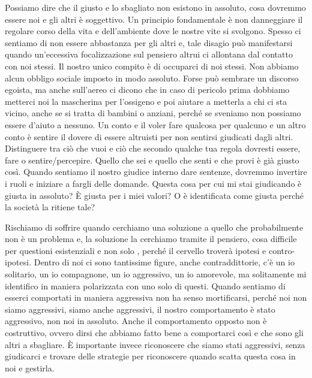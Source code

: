 \documentclass[12pt]{book} %
\begin{document}
Possiamo dire che il giusto e lo sbagliato non esistono in assoluto, cosa dovremmo essere noi e gli altri è soggettivo. Un principio fondamentale è non danneggiare il regolare corso della vita e dell'ambiente dove le nostre vite si svolgono. Spesso ci sentiamo di non essere abbastanza per gli altri e, tale disagio può manifestarsi quando un'eccessiva focalizzazione sul pensiero altrui ci allontana dal contatto con noi stessi.
Il nostro unico compito è di occuparci di noi stessi. Non abbiamo alcun obbligo sociale imposto in modo assoluto. Forse può sembrare un
discorso egoista, ma anche sull'aereo ci dicono che in caso di pericolo prima dobbiamo
metterci noi la mascherina per l'ossigeno e poi aiutare a metterla a chi ci sta vicino, anche se
si tratta di bambini o anziani, perché se sveniamo non possiamo essere d'aiuto a nessuno. 
Un conto e il voler fare qualcosa per qualcuno e un altro conto è sentire il
dovere di essere altruisti per non sentirsi giudicati dagli altri. Distinguere tra ciò
che vuoi e ciò che secondo qualche tua regola dovresti essere, fare o sentire/percepire. Quello che sei e quello che
senti e che provi è già giusto così. 
Quando sentiamo il nostro giudice interno dare sentenze, dovremmo invertire i ruoli e iniziare a fargli delle domande. Questa
cosa per cui mi stai giudicando è giusta in assoluto? È giusta per i miei valori? O è identificata come giusta perché
la società la ritiene tale?

Rischiamo di soffrire quando cerchiamo una soluzione a quello che probabilmente non è un problema e, la soluzione la cerchiamo tramite il
pensiero, cosa difficile per questioni esistenziali e non solo , perché il cervello troverà ipotesi e contro-ipotesi. Dentro
di noi ci sono tantissime figure, anche contraddittorie, c'è un io solitario, un io compagnone, un io aggressivo, un io
amorevole, ma solitamente mi identifico in maniera polarizzata con uno solo di questi. 
Quando sentiamo di esserci comportati in maniera aggressiva non ha senso mortificarsi, perché noi
non siamo aggressivi, siamo anche aggressivi, il nostro comportamento è stato aggressivo, non noi in assoluto. Anche il
comportamento opposto non è costruttivo, ovvero dirsi che abbiamo fatto bene a comportarci così e che sono gli altri a
sbagliare. È importante invece riconoscere che siamo stati aggressivi, senza giudicarci e trovare delle strategie per
riconoscere quando scatta questa cosa in noi e gestirla. 
\end{document}

